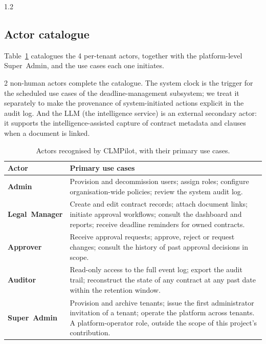 \begin{spacing}{1.2}
\subsection{Actor catalogue}
\label{sec:actors-catalogue}

Table~\ref{tab:actors} catalogues the 4 per-tenant actors, together
with the platform-level Super~Admin, and the use cases each one
initiates.

2 non-human actors complete the catalogue. The system clock is the
trigger for the scheduled use cases of the deadline-management
subsystem; we treat it separately to make the provenance of
system-initiated actions explicit in the audit log. And the LLM (the
intelligence service) is an external secondary actor: it supports the
intelligence-assisted capture of contract metadata and clauses when a
document is linked.

\begin{table}[H]
  \centering
  \caption{Actors recognised by CLMPilot, with their primary use cases.}
  \footnotesize
  \begin{tabularx}{\linewidth}{|>{\bfseries}l|X|}
    \hline
    Actor & Primary use cases \\
    \hline\hline
    Admin & Provision and decommission users; assign roles; configure
      organisation-wide policies; review the system audit log. \\
    \hline
    Legal~Manager & Create and edit contract records; attach document
      links; initiate approval workflows; consult the dashboard and
      reports; receive deadline reminders for owned contracts. \\
    \hline
    Approver & Receive approval requests; approve, reject or request
      changes; consult the history of past approval decisions in
      scope. \\
    \hline
    Auditor & Read-only access to the full event log; export the audit
      trail; reconstruct the state of any contract at any past date
      within the retention window. \\
    \hline
    Super~Admin & Provision and archive tenants; issue the first
      administrator invitation of a tenant; operate the platform across
      tenants. A platform-operator role, outside the scope of this
      project's contribution. \\
    \hline
  \end{tabularx}
  \label{tab:actors}
\end{table}


\end{spacing}
